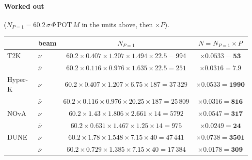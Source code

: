 \documentclass[11pt,a4paper]{article}
\begin{document}
\noindent\begin{minipage}{\textwidth}
\paragraph{Worked out} ($N_{P=1} = 60.2\,\sigma\,\Phi\,\mathrm{POT}\,M$ in the units above, then $\times P$).

\begin{center}
\small
\begin{tabular}{llcc}
\toprule
 & beam & $N_{P=1}$ & $N = N_{P=1}\times P$ \\
\midrule
T2K     & $\nu$     & $60.2\times0.407\times1.207\times1.494\times22.5 = 994$     & $\times0.0533=\mathbf{53}$ \\
        & $\bar\nu$ & $60.2\times0.116\times0.976\times1.635\times22.5 = 251$     & $\times0.0316=\mathbf{7.9}$ \\
Hyper-K & $\nu$     & $60.2\times0.407\times1.207\times6.75\times187 = 37\,329$   & $\times0.0533=\mathbf{1990}$ \\
        & $\bar\nu$ & $60.2\times0.116\times0.976\times20.25\times187 = 25\,809$  & $\times0.0316=\mathbf{816}$ \\
NOvA    & $\nu$     & $60.2\times1.43\times1.806\times2.661\times14 = 5792$       & $\times0.0547=\mathbf{317}$ \\
        & $\bar\nu$ & $60.2\times0.631\times1.467\times1.25\times14 = 975$        & $\times0.0249=\mathbf{24}$ \\
DUNE    & $\nu$     & $60.2\times1.78\times1.548\times7.15\times40 = 47\,441$     & $\times0.0738=\mathbf{3501}$ \\
        & $\bar\nu$ & $60.2\times0.729\times1.385\times7.15\times40 = 17\,384$    & $\times0.0178=\mathbf{309}$ \\
\bottomrule
\end{tabular}
\end{center}
\end{minipage}
\end{document}
